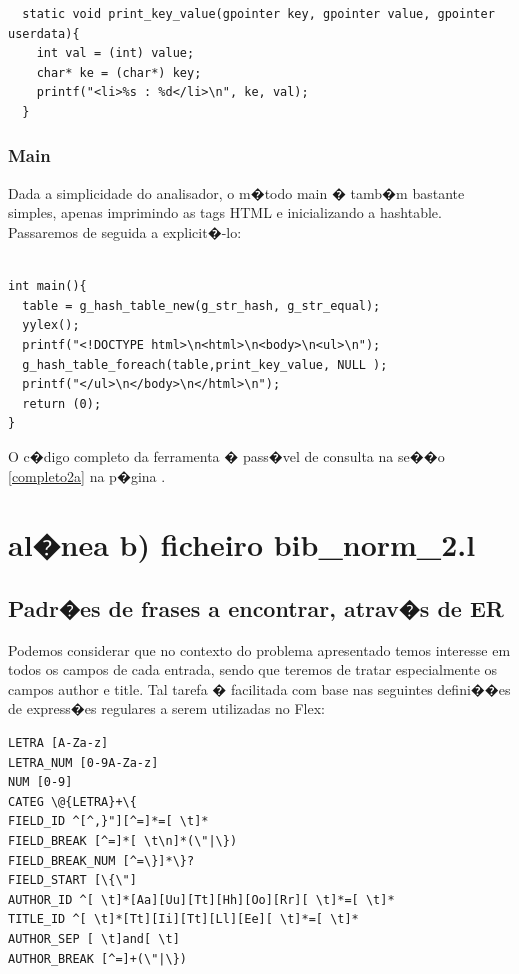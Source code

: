 \documentclass{report}
\begin{document}
  \begin{lstlisting}
  static void print_key_value(gpointer key, gpointer value, gpointer userdata){
    int val = (int) value;
    char* ke = (char*) key;
    printf("<li>%s : %d</li>\n", ke, val);
  }
\end{lstlisting}

\subsubsection{Main}
Dada a simplicidade do analisador, o m�todo main � tamb�m bastante simples, apenas imprimindo as tags HTML e inicializando a hashtable. Passaremos de seguida a explicit�-lo:
\begin{lstlisting}

int main(){
  table = g_hash_table_new(g_str_hash, g_str_equal);
  yylex();
  printf("<!DOCTYPE html>\n<html>\n<body>\n<ul>\n");
  g_hash_table_foreach(table,print_key_value, NULL );
  printf("</ul>\n</body>\n</html>\n");
  return (0);
}
\end{lstlisting}
O c�digo completo da ferramenta � pass�vel de consulta na se��o \ref{completo2a} na p�gina \pageref{completo2a}.





\section{al�nea b) ficheiro bib\_norm\_2.l }
\subsection{Padr�es de frases a encontrar, atrav�s de ER}
Podemos considerar que no contexto do problema apresentado temos interesse em todos os campos de cada entrada, sendo que teremos de tratar especialmente os campos author e title. Tal tarefa � facilitada com base nas seguintes defini��es de express�es regulares a serem utilizadas no Flex:

\begin{lstlisting}
LETRA [A-Za-z]
LETRA_NUM [0-9A-Za-z]
NUM [0-9]
CATEG \@{LETRA}+\{
FIELD_ID ^[^,}"][^=]*=[ \t]*
FIELD_BREAK [^=]*[ \t\n]*(\"|\})
FIELD_BREAK_NUM [^=\}]*\}?
FIELD_START [\{\"]
AUTHOR_ID ^[ \t]*[Aa][Uu][Tt][Hh][Oo][Rr][ \t]*=[ \t]*
TITLE_ID ^[ \t]*[Tt][Ii][Tt][Ll][Ee][ \t]*=[ \t]*
AUTHOR_SEP [ \t]and[ \t]
AUTHOR_BREAK [^=]+(\"|\})
\end{lstlisting}
\end{document}
